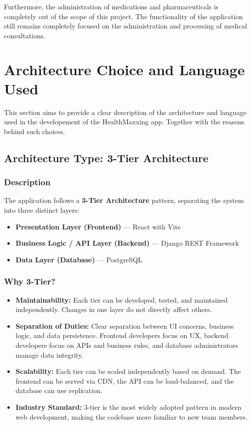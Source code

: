 \documentclass[12pt, a4paper]{article}
\begin{document}
Furthermore, the administration of medications and pharmaceuticals is completely out of the scope of this project. The functionality of the application still remains completely focused on the administration and processing of medical consultations.
\newpage

\newpage
{} %
\section{Architecture Choice and Language Used}
This section aims to provide a clear description of the architecture and language used in the developement of the HealthMaxxing app. Together with the reasons behind such choices.
\subsection{Architecture Type: 3-Tier Architecture}
\subsubsection{Description}

The application follows a \textbf{3-Tier Architecture} pattern, separating the system into three distinct layers:

\begin{itemize}
  \item \textbf{Presentation Layer (Frontend)} --- React with Vite
  \item \textbf{Business Logic / API Layer (Backend)} --- Django REST Framework
  \item \textbf{Data Layer (Database)} --- PostgreSQL
\end{itemize}
\subsubsection{Why 3-Tier?}

\begin{itemize}
  \item \textbf{Maintainability:} Each tier can be developed, tested, and maintained independently. Changes in one layer do not directly affect others.
  \item \textbf{Separation of Duties:} Clear separation between UI concerns, business logic, and data persistence. Frontend developers focus on UX, backend developers focus on APIs and business rules, and database administrators manage data integrity.
  \item \textbf{Scalability:} Each tier can be scaled independently based on demand. The frontend can be served via CDN, the API can be load-balanced, and the database can use replication.
  \item \textbf{Industry Standard:} 3-tier is the most widely adopted pattern in modern web development, making the codebase more familiar to new team members.
\end{itemize}
\end{document}

